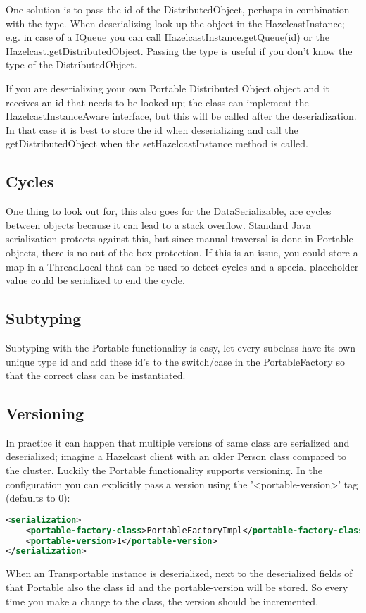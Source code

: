 One solution is to pass the id of the DistributedObject, perhaps in combination with the type. When deserializing look up the object in the HazelcastInstance; e.g. in case of a IQueue you can call HazelcastInstance.getQueue(id) or the Hazelcast.getDistributedObject. Passing the type is useful if you don't know the type of the DistributedObject.

If you are deserializing your own Portable Distributed Object object and it receives an id that needs to be looked up; the class can implement the HazelcastInstanceAware interface, but this will be called after the deserialization. In that case it is best to store the id when deserializing and call the getDistributedObject when the setHazelcastInstance method is called.

\subsection*{Cycles}
One thing to look out for, this also goes for the DataSerializable, are cycles between objects because it can lead to a stack overflow. Standard Java serialization protects against this, but since manual traversal is done in Portable objects, there is no out of the box protection. If this is an issue, you could store a map in a ThreadLocal that can be used to detect cycles and a special placeholder value could be serialized to end the cycle.

\subsection*{Subtyping}
Subtyping with the Portable functionality is easy, let every subclass have its own unique type id and add these id's to the switch/case in the PortableFactory so that the correct class can be instantiated. 

\subsection*{Versioning}
In practice it can happen that multiple versions of same class are serialized and deserialized; imagine a Hazelcast client with an older Person class compared to the cluster. Luckily the Portable functionality supports versioning. In the configuration you can explicitly pass a version using the '<portable-version>' tag (defaults to 0):
\begin{lstlisting}[language=xml]
<serialization>
    <portable-factory-class>PortableFactoryImpl</portable-factory-class>
    <portable-version>1</portable-version>
</serialization>
\end{lstlisting}
When an Transportable instance is deserialized, next to the deserialized fields of that Portable also the class id and the portable-version will be stored. So every time you make a change to the class, the version should be incremented. 

